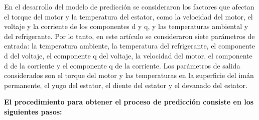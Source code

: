 \documentclass{article}
\begin{document}
En el desarrollo del modelo de predicción se consideraron los factores que afectan el torque del motor y la temperatura del estator, como la velocidad del motor, el voltaje y la corriente de los componentes d y q, y las temperaturas ambiental y del refrigerante. Por lo tanto, en este artículo se consideraron siete parámetros de entrada: la temperatura ambiente, la temperatura del refrigerante, el componente d del voltaje, el componente q del voltaje, la velocidad del motor, el componente d de la corriente y el componente q de la corriente. Los parámetros de salida considerados son el torque del motor y las temperaturas en la superficie del imán permanente, el yugo del estator, el diente del estator y el devanado del estator.

\textbf{El procedimiento para obtener el proceso de predicción consiste en los siguientes pasos:}
\end{document}
